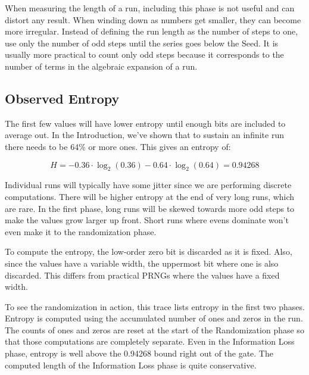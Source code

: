\documentclass[letterpaper]{article}
\begin{document}
\begin{multicols}{2}
When measuring the length of a run, including this phase is not useful and can distort any result. When winding down as numbers get smaller, they can become more irregular. Instead of defining the run length as the number of steps to one, use only the number of odd steps until the series goes below the Seed. It is usually more practical to count only odd steps because it corresponds to the number of terms in the algebraic expansion of a run.

\subsection{Observed Entropy}

The first few values will have lower entropy until enough bits are included to average out. In the Introduction, we've shown that to sustain an infinite run there needs to be 64\% or more ones. This gives an entropy of:

\[ H = -0.36 \cdot \log_2(0.36) - 0.64 \cdot \log_2(0.64) = 0.94268 \]

Individual runs will typically have some jitter since we are performing discrete computations. There will be higher entropy at the end of very long runs, which are rare. In the first phase, long runs will be skewed towards more odd steps to make the values grow larger up front. Short runs where evens dominate won't even make it to the randomization phase.

To compute the entropy, the low-order zero bit is discarded as it is fixed. Also, since the values have a variable width, the uppermost bit where one is also discarded. This differs from practical PRNGs where the values have a fixed width.

To see the randomization in action, this trace lists entropy in the first two phases. Entropy is computed using the accumulated number of ones and zeros in the run. The counts of ones and zeros are reset at the start of the Randomization phase so that those computations are completely separate. Even in the Information Loss phase, entropy is well above the 0.94268 bound right out of the gate. The computed length of the Information Loss phase is quite conservative.


\end{multicols}
\end{document}
